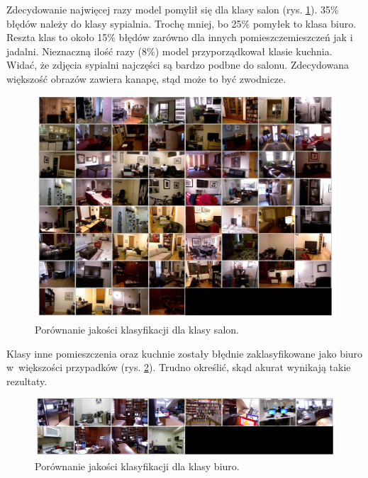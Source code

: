 Zdecydowanie najwięcej razy model pomylił się dla klasy salon (rys. \ref{fig:living_room-false-pred}). 35\% błędów należy do klasy sypialnia. Trochę mniej, bo 25\% pomyłek to klasa biuro. Reszta klas to około 15\% błędów zarówno dla innych pomieszczemieszczeń jak i jadalni. Nieznaczną ilość razy (8\%) model przyporządkował klasie kuchnia. Widać, że zdjęcia sypialni najczęści są bardzo podbne do salonu. Zdecydowana większość obrazów zawiera kanapę, stąd może to być zwodnicze.

\begin{figure}[ht!]
    \centering
    \includegraphics[width=\textwidth]{img/preds_analysis/classification/living_room-2.png}
    \caption{Porównanie jakości klasyfikacji dla klasy salon.}
    \label{fig:living_room-false-pred}
\end{figure}

Klasy inne pomieszczenia oraz kuchnie zostały błędnie zaklasyfikowane jako biuro w~większości przypadków (rys. \ref{fig:office-false-pred}). Trudno określić, skąd akurat wynikają takie rezultaty.

\begin{figure}[ht!]
    \centering
    \includegraphics[width=\textwidth]{img/preds_analysis/classification/office-2.png}
    \caption{Porównanie jakości klasyfikacji dla klasy biuro.}
    \label{fig:office-false-pred}
\end{figure}

